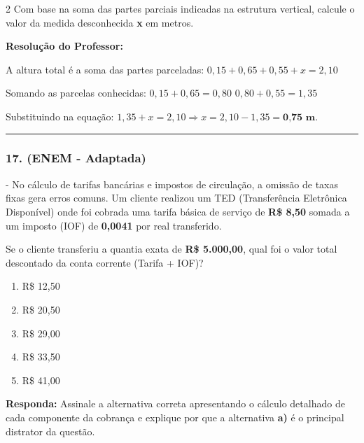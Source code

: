 \begin{multicols*}{2}
Com base na soma das partes parciais indicadas na estrutura vertical, calcule o valor da medida desconhecida \textbf{x} em metros.

\ifgabarito
    \begin{tcolorbox}[colback=CorTitUm!5, colframe=CorTitUm, boxrule=1pt, arc=4pt, left=6pt, right=6pt, top=6pt, bottom=6pt]
    \small\textbf{\textcolor{CorTitUm}{Resolução do Professor:}}\par\vspace{0.1cm}
    \color{CinzaEscuro}
    A altura total é a soma das partes parceladas:
    $0,15 + 0,65 + 0,55 + x = 2,10$
    
    Somando as parcelas conhecidas:
    $0,15 + 0,65 = 0,80$
    $0,80 + 0,55 = 1,35$
    
    Substituindo na equação:
    $1,35 + x = 2,10 \Rightarrow x = 2,10 - 1,35 = \textbf{0,75 m}$.
    \end{tcolorbox}
\fi

\par\vspace{\espacoQuestao}

\noindent\textcolor{CorLinha}{\rule{\linewidth}{0.5pt}} 
\par\vspace{\espacoPreQuestao}
\subsubsection*{17. (ENEM - Adaptada)} - No cálculo de tarifas bancárias e impostos de circulação, a omissão de taxas fixas gera erros comuns. Um cliente realizou um TED (Transferência Eletrônica Disponível) onde foi cobrada uma tarifa básica de serviço de \textbf{R\$ 8,50} somada a um imposto (IOF) de \textbf{0,0041} por real transferido.

Se o cliente transferiu a quantia exata de \textbf{R\$ 5.000,00}, qual foi o valor total descontado da conta corrente (Tarifa + IOF)?
\begin{enumerate}[label=\alph*), itemsep=\espacoAlt]
    \item R\$ 12,50
    \item R\$ 20,50
    \item R\$ 29,00
    \item R\$ 33,50
    \item R\$ 41,00
\end{enumerate}
\begin{boxresponda}
\textbf{Responda:} Assinale a alternativa correta apresentando o cálculo detalhado de cada componente da cobrança e explique por que a alternativa \textbf{a)} é o principal distrator da questão.
\end{boxresponda}


\end{multicols*}
